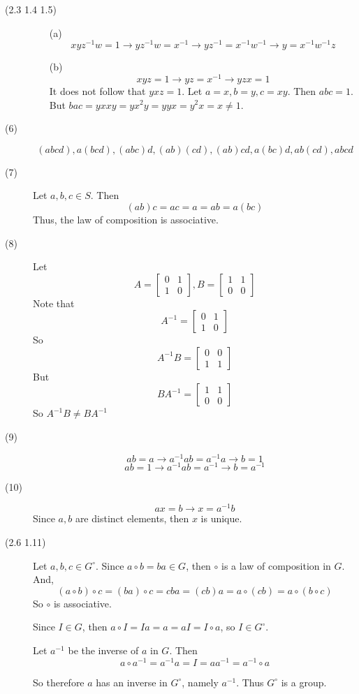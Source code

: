 \begin{description}
\item[(2.3 {\color{cBlue}1.4} {\color{cBlue}1.5})]
\begin{itemize}
\item[(a)] $$xyz^{-1}w = 1 \rightarrow yz^{-1}w = x^{-1} \rightarrow yz^{-1} = x^{-1}w^{-1} \rightarrow y = x^{-1}w^{-1}z$$
\item[(b)] $$xyz = 1 \rightarrow yz = x^{-1} \rightarrow yzx = 1$$
It does not follow that $yxz = 1$. Let $a = x, b = y, c = xy$. Then $abc = 1$. But $bac = yxxy = yx^2y = yyx = y^2x = x \neq 1$.
\end{itemize}

\item[(6)]
$$(abcd), a(bcd), (abc)d, (ab)(cd), (ab)cd, a(bc)d, ab(cd), abcd$$
\item[(7)]
Let $a, b, c \in S$. Then
$$(ab)c = ac = a = ab = a(bc)$$
Thus, the law of composition is associative.
\item[(8)]
Let $$A = \begin{bmatrix}
0 & 1 \\
1 & 0
\end{bmatrix}, B = \begin{bmatrix}
1 & 1 \\
0 & 0
\end{bmatrix}$$
Note that
$$A^{-1} = \begin{bmatrix}
0 & 1 \\
1 & 0
\end{bmatrix}$$
So
$$A^{-1}B = \begin{bmatrix}
0 & 0 \\
1 & 1
\end{bmatrix}$$
But
$$BA^{-1} = \begin{bmatrix}
1 & 1 \\
0 & 0
\end{bmatrix}$$
So $A^{-1}B \neq BA^{-1}$
\item[(9)]
$$ab = a \rightarrow a^{-1}ab = a^{-1}a \rightarrow b = 1$$
$$ab = 1 \rightarrow a^{-1}ab = a^{-1} \rightarrow b = a^{-1}$$
\item[(10)]
$$ax = b \rightarrow x = a^{-1}b$$
Since $a, b$ are distinct elements, then $x$ is unique.
\item[(2.6 {\color{cBlue}1.11})]
Let $a, b, c \in G^\circ$. Since $a \circ b = ba \in G$, then $\circ$ is a law of composition in $G$. And,
$$(a \circ b) \circ c = (ba) \circ c = cba = (cb)a = a \circ (cb) = a \circ (b \circ c)$$
So $\circ$ is associative.

Since $I \in G$, then $a \circ I = Ia = a = aI = I \circ a$, so $I \in G^\circ$.

Let $a^{-1}$ be the inverse of $a$ in $G$. Then
$$a \circ a^{-1} = a^{-1}a = I = aa^{-1} = a^{-1} \circ a$$

So therefore $a$ has an inverse in $G^\circ$, namely $a^{-1}$. Thus $G^\circ$ is a group.
\end{description}